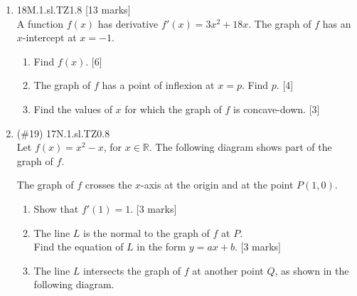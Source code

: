 \documentclass[12pt, twoside]{article}
\begin{document}
\begin{enumerate}
\newpage

  \item 18M.1.sl.TZ1.8 \hfill [13 marks]\\
  A function $f(x)$ has derivative $f'(x) = 3x^2 + 18x$. The graph of $f$ has an $x$-intercept at $x = -1$.
  \begin{enumerate}
    \item Find $f(x)$. \hfill [6]
    \item The graph of $f$ has a point of inflexion at $x = p$. Find $p$. \hfill [4]
    \item Find the values of $x$ for which the graph of $f$ is concave-down. \hfill [3]
  \end{enumerate}

    \newpage

    \item (\#19) 17N.1.sl.TZ0.8\\
    Let $f(x)= x^2-x$, for $x \in \mathbb{R}$. The following diagram shows part of the graph of $f$.
      \begin{center}
      \end{center}
      The graph of $f$ crosses the $x$-axis at the origin and at the point $P(1,0)$.
      \begin{enumerate}
        \item Show that $f'(1)=1$. [3 marks]
        \item The line $L$ is the normal to the graph of $f$ at $P$.\\
        Find the equation of $L$ in the form $y=ax+b$. [3 marks]
        \item The line $L$ intersects the graph of $f$ at another point $Q$, as shown in the following diagram.
          \begin{center}
\end{center}
\end{enumerate}
\end{enumerate}
\end{document}

